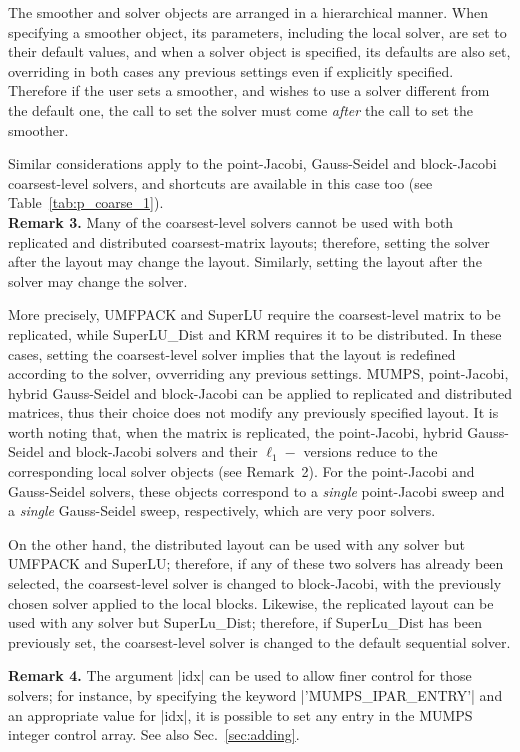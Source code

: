 The smoother and solver objects are arranged in a
hierarchical manner. When specifying a smoother object, its parameters,
including the local solver, are set to their default values, and when a solver
object is specified, its defaults are also set, overriding in both
cases any previous settings even if explicitly specified. Therefore if
the user sets a smoother, and wishes to use a solver
different from  the default one, the call to set the solver must come
\emph{after} the call to set the smoother.

Similar considerations apply to the point-Jacobi, Gauss-Seidel and block-Jacobi
coarsest-level solvers, and shortcuts are available
in this case too (see Table~\ref{tab:p_coarse_1}). \\

\textbf{Remark 3.} Many of the coarsest-level solvers cannot be used
with both replicated and distributed coarsest-matrix layouts; 
therefore, setting the solver after the layout may change the layout.
Similarly, setting the layout after the solver may change the solver.

More precisely, UMFPACK and SuperLU require the coarsest-level
matrix to be replicated, while SuperLU\_Dist and KRM requires it to be distributed.
In these cases, setting the coarsest-level solver implies that
the layout is redefined according to the solver, ovverriding any
previous settings. MUMPS,  point-Jacobi,
hybrid Gauss-Seidel and block-Jacobi can be applied to
replicated and distributed matrices, thus their choice
does not modify any previously specified layout.
It is worth noting that, when the matrix is replicated,
the point-Jacobi, hybrid Gauss-Seidel and block-Jacobi solvers and their $\ell_1-$ versions
reduce to the corresponding local solver objects (see Remark~2).
For the point-Jacobi and Gauss-Seidel solvers, these objects
correspond to a \emph{single} point-Jacobi sweep and a \emph{single}
Gauss-Seidel sweep, respectively, which are very poor solvers.

On the other hand, the distributed layout can be used with any solver
but UMFPACK and SuperLU; therefore, if any of these two solvers has already
been selected, the coarsest-level solver is changed to block-Jacobi,
with the previously chosen solver applied to the local blocks.
Likewise, the replicated layout can be used with any solver but SuperLu\_Dist;
therefore, if SuperLu\_Dist has been previously set, the coarsest-level
solver is changed to the default sequential solver.

\textbf{Remark 4.}  The argument \fortinline|idx| can be used to allow finer
control for those solvers; for instance, by specifying the keyword
\fortinline|'MUMPS_IPAR_ENTRY'| and an appropriate value for \fortinline|idx|, it is
possible to set any entry in the MUMPS integer control array.
See also Sec.~\ref{sec:adding}.


